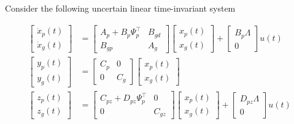 \documentclass[journal]{IEEEtran}
\theoremstyle{innercustomthm}
\begin{document}
  Consider the following uncertain linear time-invariant system

  {%
    \small
    \setlength{\abovedisplayskip}{0pt}
    \setlength{\belowdisplayskip}{6pt}
    \setlength{\abovedisplayshortskip}{3pt}
    \setlength{\belowdisplayshortskip}{3pt}
    \begin{align}
      \label{eqn.wholeSystemUncertain}
      \begin{bmatrix}
        \dot{x}_{p}(t) \\
        \dot{x}_{g}(t)
      \end{bmatrix}
      &=
      \begin{bmatrix}
        A_{p}+B_{p}\Psi_{p}^{\top} & B_{gd} \\
        B_{gp} & A_{g}
      \end{bmatrix}
      \begin{bmatrix}
        x_{p}(t) \\
        x_{g}(t)
      \end{bmatrix}
      +
      \begin{bmatrix}
        B_{p}\Lambda \\
        0
      \end{bmatrix}
      u(t) \nonumber \\
      \begin{bmatrix}
        y_{p}(t) \\
        y_{g}(t)
      \end{bmatrix}
      &=
      \begin{bmatrix}
        C_{p} & 0 \\
        0 & C_{g}
      \end{bmatrix}
      \begin{bmatrix}
        x_{p}(t) \\
        x_{g}(t)
      \end{bmatrix} \\
      \begin{bmatrix}
        z_{p}(t) \\
        z_{g}(t)
      \end{bmatrix}
      &=
      \begin{bmatrix}
        C_{pz}+D_{pz}\Psi_{p}^{\top} & 0 \\
        0 & C_{gz}
      \end{bmatrix}
      \begin{bmatrix}
        x_{p}(t) \\
        x_{g}(t)
      \end{bmatrix}
      +
      \begin{bmatrix}
        D_{pz}\Lambda \\
        0
      \end{bmatrix}
      u(t) \nonumber
    \end{align}
  }%
\end{document}
